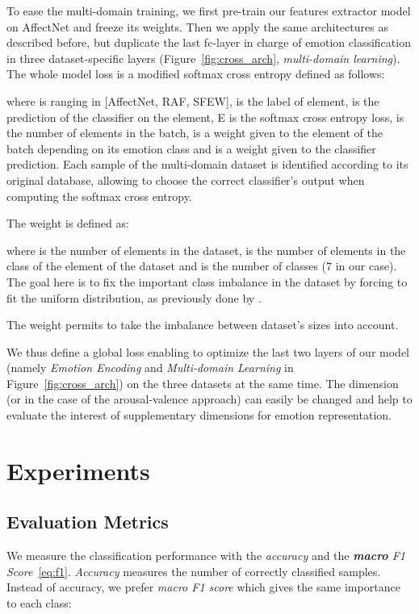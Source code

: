 \documentclass{bmvc2k}
\begin{document}
To ease the multi-domain training, we first pre-train our features extractor model on AffectNet and freeze its weights. Then we apply the same architectures as described before, but duplicate the last fc-layer in charge of emotion classification in three dataset-specific layers (Figure~\ref{fig:cross_arch}, \textit{multi-domain learning}). The whole model loss is a modified softmax cross entropy defined as follows:

where  is ranging in [AffectNet, RAF, SFEW],   is the label of  element,  is the prediction of the  classifier on the  element, E is the softmax cross entropy loss,   is the number of elements in the batch,  is a weight given to the  element of the batch depending on its emotion class and  is a weight given to the  classifier prediction.
Each sample of the multi-domain dataset is identified according to its original database, allowing to choose the correct classifier's output when computing the softmax cross entropy.

The  weight is defined as:

where  is the number of elements in the  dataset,  is the number of elements in the class of the  element of the  dataset and  is the number of classes (7 in our case). The goal here is to fix the important class imbalance in the dataset by forcing to fit the uniform distribution, as previously done by \cite{mollahosseini_affectnet:_2017}.

The  weight permits to take the imbalance between dataset's sizes into account.


We thus define a global loss enabling to optimize the last two layers of our model (namely \textit{Emotion Encoding} and \textit{Multi-domain Learning}  in Figure~\ref{fig:cross_arch}) on the three datasets at the same time. The dimension  (or  in the case of the arousal-valence approach) can easily be changed and help to evaluate the interest of supplementary dimensions for emotion representation.  \section{Experiments}
\label{results}
\subsection{Evaluation Metrics}
We measure the classification performance with the \textit{accuracy} and the \textit{\textbf{macro} F1 Score}~\eqref{eq:f1}. \textit{Accuracy} measures the number of correctly classified samples. Instead of accuracy, we prefer \textit{macro F1 score} which gives the same importance to each class:
\end{document}
